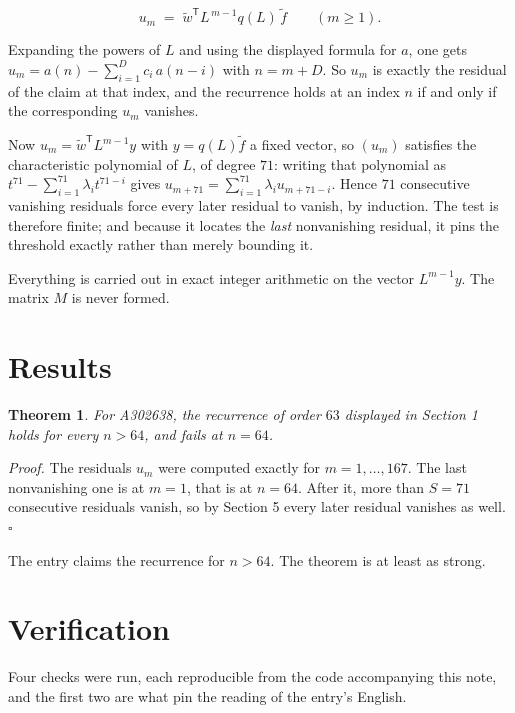 \documentclass[11pt]{article}
\newtheorem{theorem}{Theorem}
\theoremstyle{definition}
\begin{document}
\[u_m \;=\; \tilde w^{\mathsf T} L^{\,m-1} q(L)\,\tilde f \qquad (m \ge 1).\]

Expanding the powers of $L$ and using the displayed formula for $a$, one gets $u_m = a(n) - \sum_{i=1}^{D} c_i\,a(n-i)$ with $n = m + D$. So $u_m$ is exactly the residual of the claim at that index, and the recurrence holds at an index $n$ if and only if the corresponding $u_m$ vanishes.

Now $u_m = \tilde w^{\mathsf T} L^{m-1} y$ with $y = q(L)\tilde f$ a fixed vector, so $(u_m)$ satisfies the characteristic polynomial of $L$, of degree $71$: writing that polynomial as $t^{71} - \sum_{i=1}^{71} \lambda_i t^{71-i}$ gives $u_{m+71} = \sum_{i=1}^{71} \lambda_i u_{m+71-i}$. Hence $71$ consecutive vanishing residuals force every later residual to vanish, by induction. The test is therefore finite; and because it locates the {\itshape last} nonvanishing residual, it pins the threshold exactly rather than merely bounding it.

Everything is carried out in exact integer arithmetic on the vector $L^{m-1}y$. The matrix $M$ is never formed.

\section{Results}

\begin{theorem} For A302638, the recurrence of order $63$ displayed in Section 1 holds for every $n > 64$, and fails at $n = 64$.\end{theorem}

{\itshape Proof.} The residuals $u_m$ were computed exactly for $m = 1,\dots,167$. The last nonvanishing one is at $m = 1$, that is at $n = 64$. After it, more than $S = 71$ consecutive residuals vanish, so by Section 5 every later residual vanishes as well. $\square$

The entry claims the recurrence for $n > 64$. The theorem is at least as strong.

\section{Verification}

Four checks were run, each reproducible from the code accompanying this note, and the first two are what pin the reading of the entry's English.
\end{document}
